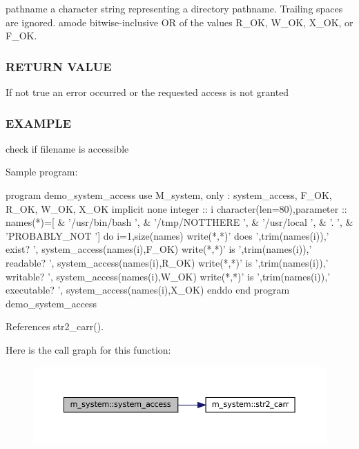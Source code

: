 pathname a character string representing a directory pathname. Trailing spaces are ignored. amode bitwise-\/inclusive OR of the values R\+\_\+\+OK, W\+\_\+\+OK, X\+\_\+\+OK, or F\+\_\+\+OK.

\subsubsection*{R\+E\+T\+U\+RN V\+A\+L\+UE}

If not true an error occurred or the requested access is not granted

\subsubsection*{E\+X\+A\+M\+P\+LE}

check if filename is accessible \begin{DoxyVerb} Sample program:

    program demo_system_access
    use M_system, only : system_access, F_OK, R_OK, W_OK, X_OK
    implicit none
    integer                     :: i
    character(len=80),parameter :: names(*)=[ &
    '/usr/bin/bash   ', &
    '/tmp/NOTTHERE   ', &
    '/usr/local      ', &
    '.               ', &
    'PROBABLY_NOT    ']
    do i=1,size(names)
       write(*,*)' does ',trim(names(i)),' exist?    ', system_access(names(i),F_OK)
       write(*,*)' is ',trim(names(i)),' readable?     ', system_access(names(i),R_OK)
       write(*,*)' is ',trim(names(i)),' writable?     ', system_access(names(i),W_OK)
       write(*,*)' is ',trim(names(i)),' executable?   ', system_access(names(i),X_OK)
    enddo
    end program demo_system_access \end{DoxyVerb}
 

References str2\+\_\+carr().

Here is the call graph for this function\+:\nopagebreak
\begin{figure}[H]
\begin{center}
\leavevmode
\includegraphics[width=350pt]{namespacem__system_a4c1c906730e61629a8277e1daeda90f6_cgraph}
\end{center}
\end{figure}
\mbox{\label{namespacem__system_a47746b670cb21bae0957c9bb2bccf209}} 
